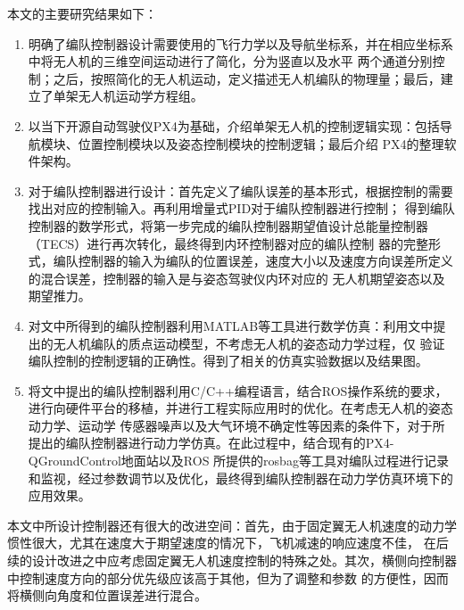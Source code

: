 本文的主要研究结果如下：
\begin{enumerate}
    \item 明确了编队控制器设计需要使用的飞行力学以及导航坐标系，并在相应坐标系中将无人机的三维空间运动进行了简化，分为竖直以及水平
        两个通道分别控制；之后，按照简化的无人机运动，定义描述无人机编队的物理量；最后，建立了单架无人机运动学方程组。
    \item 以当下开源自动驾驶仪PX4为基础，介绍单架无人机的控制逻辑实现：包括导航模块、位置控制模块以及姿态控制模块的控制逻辑；最后介绍
        PX4的整理软件架构。
    \item 对于编队控制器进行设计：首先定义了编队误差的基本形式，根据控制的需要找出对应的控制输入。再利用增量式PID对于编队控制器进行控制；
        得到编队控制器的数学形式，将第一步完成的编队控制器期望值设计总能量控制器（TECS）进行再次转化，最终得到内环控制器对应的编队控制
        器的完整形式，编队控制器的输入为编队的位置误差，速度大小以及速度方向误差所定义的混合误差，控制器的输入是与姿态驾驶仪内环对应的
        无人机期望姿态以及期望推力。
    \item 对文中所得到的编队控制器利用MATLAB等工具进行数学仿真：利用文中提出的无人机编队的质点运动模型，不考虑无人机的姿态动力学过程，仅
        验证编队控制的控制逻辑的正确性。得到了相关的仿真实验数据以及结果图。
    \item 将文中提出的编队控制器利用C/C++编程语言，结合ROS操作系统的要求，进行向硬件平台的移植，并进行工程实际应用时的优化。在考虑无人机的姿态动力学、运动学
        传感器噪声以及大气环境不确定性等因素的条件下，对于所提出的编队控制器进行动力学仿真。在此过程中，结合现有的PX4-QGroundControl地面站以及ROS
        所提供的rosbag等工具对编队过程进行记录和监视，经过参数调节以及优化，最终得到编队控制器在动力学仿真环境下的应用效果。
\end{enumerate}
本文中所设计控制器还有很大的改进空间：首先，由于固定翼无人机速度的动力学惯性很大，尤其在速度大于期望速度的情况下，飞机减速的响应速度不佳，
在后续的设计改进之中应考虑固定翼无人机速度控制的特殊之处。其次，横侧向控制器中控制速度方向的部分优先级应该高于其他，但为了调整和参数
的方便性，因而将横侧向角度和位置误差进行混合。
